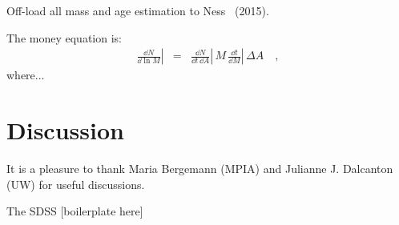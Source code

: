 \documentclass[12pt, preprint]{aastex}
\begin{document}
Off-load all mass and age estimation to Ness \etal\ (2015).

The money equation is:
\begin{eqnarray}
  \left.\frac{\dd N}{\dd\ln M}\right| &=&
  \left.\frac{\dd N}{\dd t\,\dd A}\right|
  \,M\,\left.\frac{\dd t}{\dd M}\right|
  \,\Delta A
  \quad ,
\end{eqnarray}
where...

\section{Discussion}

\acknowledgements
It is a pleasure to thank
  Maria Bergemann (MPIA)
  and
  Julianne J. Dalcanton (UW)
for useful discussions.

The SDSS [boilerplate here]
\end{document}
